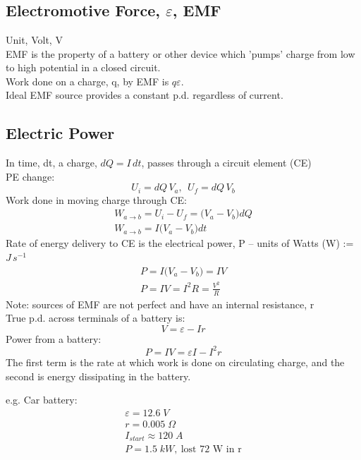 \documentclass[a4paper, 11pt, fleqn, normalem]{report}
\begin{document}
\chapter{}
\section{Electromotive Force, $\varepsilon$, EMF}
Unit, Volt, V \\
EMF is the property of a battery or other device which 'pumps' charge from low to high potential in a closed circuit. \\
Work done on a charge, q, by EMF is $q\varepsilon$. \\
Ideal EMF source provides a constant p.d. regardless of current.

\section{Electric Power}
In time, dt, a charge, $dQ = I\,dt$, passes through a circuit element (CE) \\
PE change:
\begin{equation*}
    U_{i} = dQ\,V_{a}, ~~ U_{f} = dQ\,V_{b}
\end{equation*}
Work done in moving charge through CE:
\begin{gather*}
    W_{a \to b} = U_{i} - U_{f} = \big(V_{a} - V_{b} \big)dQ \\
    W_{a \to b} = I\big(V_{a} - V_{b} \big)dt
\end{gather*}
Rate of energy delivery to CE is the electrical power, P -- units of Watts (W) := $J\,s^{-1}$
\begin{gather*}
    P = I\big(V_{a} - V_{b} \big) = IV \\
    P = IV = I^{2}R = \frac{V^{2}}{R}
\end{gather*}
Note: sources of EMF are not perfect and have an internal resistance, r \\
True p.d. across terminals of a battery is:
\begin{equation*}
    V = \varepsilon - Ir
\end{equation*}
Power from a battery:
\begin{equation*}
    P = IV = \varepsilon I - I^{2}r
\end{equation*}
The first term is the rate at which work is done on circulating charge, and the second is energy dissipating in the battery.

e.g. Car battery:
\begin{gather*}
    \varepsilon = 12.6 \; V \\
    r = 0.005 \; \Omega \\
    I_{start} \approx 120 \; A \\
    P = 1.5 \; kW,~\text{lost 72 W in r}
\end{gather*}
\end{document}
